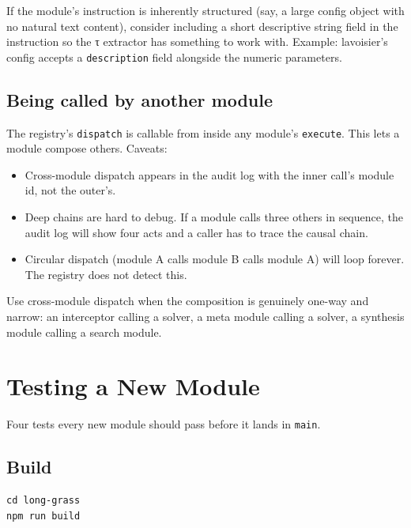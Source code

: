 \documentclass[11pt,a4paper]{article}
\theoremstyle{contract}
\begin{document}
If the module's instruction is inherently structured (say, a large
config object with no natural text content), consider including a
short descriptive string field in the instruction so the τ extractor
has something to work with. Example: lavoisier's config accepts a
\texttt{description} field alongside the numeric parameters.

\subsection{Being called by another module}

The registry's \texttt{dispatch} is callable from inside any module's
\texttt{execute}. This lets a module compose others. Caveats:

\begin{itemize}[nosep,leftmargin=1.4em]
\item Cross-module dispatch appears in the audit log with the inner
call's module id, not the outer's.
\item Deep chains are hard to debug. If a module calls three others in
sequence, the audit log will show four acts and a caller has to trace
the causal chain.
\item Circular dispatch (module A calls module B calls module A) will
loop forever. The registry does not detect this.
\end{itemize}

Use cross-module dispatch when the composition is genuinely one-way and
narrow: an interceptor calling a solver, a meta module calling a
solver, a synthesis module calling a search module.

\section{Testing a New Module}
\label{sec:testing}

Four tests every new module should pass before it lands in
\texttt{main}.

\subsection{Build}

\begin{lstlisting}[style=shell]
cd long-grass
npm run build
\end{lstlisting}
\end{document}
